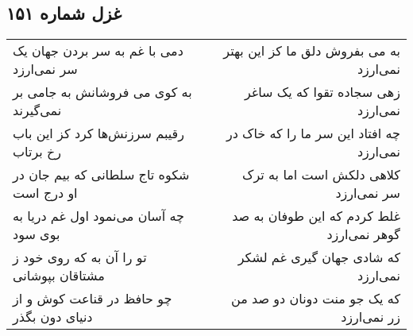 \begin{center}
\section*{غزل شماره ۱۵۱}
\label{sec:sh151}
\begin{longtable}{l p{0.5cm} r}
دمی با غم به سر بردن جهان یک سر نمی‌ارزد
&&
به می بفروش دلق ما کز این بهتر نمی‌ارزد
\\
به کوی می فروشانش به جامی بر نمی‌گیرند
&&
زهی سجاده تقوا که یک ساغر نمی‌ارزد
\\
رقیبم سرزنش‌ها کرد کز این باب رخ برتاب
&&
چه افتاد این سر ما را که خاک در نمی‌ارزد
\\
شکوه تاج سلطانی که بیم جان در او درج است
&&
کلاهی دلکش است اما به ترک سر نمی‌ارزد
\\
چه آسان می‌نمود اول غم دریا به بوی سود
&&
غلط کردم که این طوفان به صد گوهر نمی‌ارزد
\\
تو را آن به که روی خود ز مشتاقان بپوشانی
&&
که شادی جهان گیری غم لشکر نمی‌ارزد
\\
چو حافظ در قناعت کوش و از دنیای دون بگذر
&&
که یک جو منت دونان دو صد من زر نمی‌ارزد
\\
\end{longtable}
\end{center}
